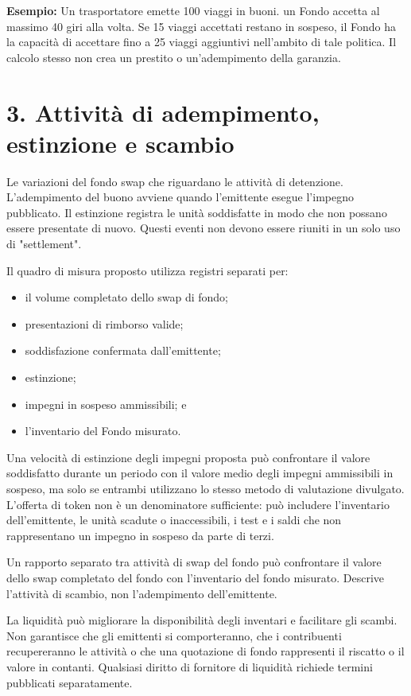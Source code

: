 \documentclass[11pt]{article}
\begin{document}
\textbf{Esempio:} Un trasportatore emette 100 viaggi in buoni. un Fondo accetta al massimo 40 giri alla volta. Se 15 viaggi accettati restano in sospeso, il Fondo ha la capacità di accettare fino a 25 viaggi aggiuntivi nell'ambito di tale politica. Il calcolo stesso non crea un prestito o un'adempimento della garanzia.



\section*{3. Attività di adempimento, estinzione e scambio}

Le variazioni del fondo swap che riguardano le attività di detenzione. L'adempimento del buono avviene quando l'emittente esegue l'impegno pubblicato. Il estinzione registra le unità soddisfatte in modo che non possano essere presentate di nuovo. Questi eventi non devono essere riuniti in un solo uso di "settlement".

Il quadro di misura proposto utilizza registri separati per:

\begin{itemize}[leftmargin=*]
\item il volume completato dello swap di fondo;
\item presentazioni di rimborso valide;
\item soddisfazione confermata dall'emittente;
\item estinzione;
\item impegni in sospeso ammissibili; e
\item l'inventario del Fondo misurato.
\end{itemize}
Una velocità di estinzione degli impegni proposta può confrontare il valore soddisfatto durante un periodo con il valore medio degli impegni ammissibili in sospeso, ma solo se entrambi utilizzano lo stesso metodo di valutazione divulgato. L'offerta di token non è un denominatore sufficiente: può includere l'inventario dell'emittente, le unità scadute o inaccessibili, i test e i saldi che non rappresentano un impegno in sospeso da parte di terzi.

Un rapporto separato tra attività di swap del fondo può confrontare il valore dello swap completato del fondo con l'inventario del fondo misurato. Descrive l'attività di scambio, non l'adempimento dell'emittente.

La liquidità può migliorare la disponibilità degli inventari e facilitare gli scambi. Non garantisce che gli emittenti si comporteranno, che i contribuenti recupereranno le attività o che una quotazione di fondo rappresenti il riscatto o il valore in contanti. Qualsiasi diritto di fornitore di liquidità richiede termini pubblicati separatamente.
\end{document}
